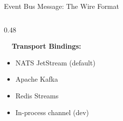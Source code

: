 \begin{frame}[fragile]{Event Bus Message: The Wire Format}
\begin{columns}[T]
\begin{column}{0.48\textwidth}
      \vspace{0.1cm}

      \fontsize{5}{6}\selectfont
      \textbf{\faBolt\ \ Transport Bindings:}
      \begin{itemize}
        \setlength{\itemsep}{0pt}
        \item NATS JetStream (default)
        \item Apache Kafka
        \item Redis Streams
        \item In-process channel (dev)
      \end{itemize}
    \end{column}
  \end{columns}
\end{frame}
